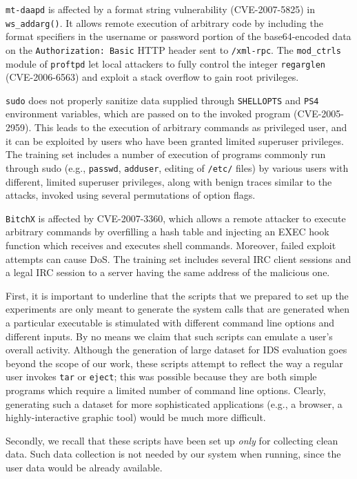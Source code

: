 \texttt{mt-daapd} is affected by a format string vulnerability
(CVE-2007-5825) in \texttt{ws\_addarg()}. It allows remote execution
of arbitrary code by including the format specifiers in the username
or password portion of the base64-encoded data on the
\texttt{Authorization: Basic} \ac{HTTP} header sent to
\texttt{/xml-rpc}. The \texttt{mod\_ctrls} module of \texttt{proftpd}
let local attackers to fully control the integer \texttt{regarglen}
(CVE-2006-6563) and exploit a stack overflow to gain root privileges.

\texttt{sudo} does not properly sanitize data supplied through
\texttt{SHELLOPTS} and \texttt{PS4} environment variables, which are
passed on to the invoked program (CVE-2005-2959). This leads to the
execution of arbitrary commands as privileged user, and it can be
exploited by users who have been granted limited superuser
privileges. The training set includes a number of execution of
programs commonly run through sudo (e.g., \texttt{passwd},
\texttt{adduser}, editing of \texttt{/etc/} files) by various users
with different, limited superuser privileges, along with benign traces
similar to the attacks, invoked using several permutations of option
flags.

\texttt{BitchX} is affected by CVE-2007-3360, which allows a remote
attacker to execute arbitrary commands by overfilling a hash table and
injecting an EXEC hook function which receives and executes shell
commands. Moreover, failed exploit attempts can cause DoS. The
training set includes several \ac{IRC} client sessions and
a legal \ac{IRC} session to a server having the same
address of the malicious one.

\begin{note}
  First, it is important to underline that the scripts that we
  prepared to set up the experiments are only meant to generate the
  system calls that are generated when a particular executable is
  stimulated with different command line options and different
  inputs. By no means we claim that such scripts can emulate a user's
  overall activity. Although the generation of large dataset for
  \ac{IDS} evaluation goes beyond the scope of our work, these scripts
  attempt to reflect the way a regular user invokes \texttt{tar} or
  \texttt{eject}; this was possible because they are both simple
  programs which require a limited number of command line
  options. Clearly, generating such a dataset for more sophisticated
  applications (e.g., a browser, a highly-interactive graphic tool)
  would be much more difficult.

  Secondly, we recall that these scripts have been set up \emph{only}
  for collecting clean data. Such data collection is not needed by our
  system when running, since the user data would be already available.
\end{note}

